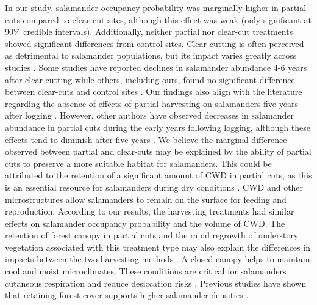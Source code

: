 In our study, salamander occupancy probability was marginally higher in partial cuts compared to clear-cut sites, although this effect was weak (only significant at 90\% credible intervals). 
Additionally, neither partial nor clear-cut treatments showed significant differences from control sites. 
Clear-cutting is often perceived as detrimental to salamander populations, but its impact varies greatly across studies \citep{Hocking2013Effectsexperimental,Chaudhary2016Impactforest}. 
Some studies have reported declines in salamander abundance 4-6 years after clear-cutting \citep{Petranka1993Effectstimber,Herbeck1999PlethodontidSalamander,Grialou2000effectsforest,Macneil2014Effectstimber}  
while others, including ours, found no significant difference between clear-cuts and control sites \citep{Renken2004EffectsForest,Mazerolle2021Woodlandsalamander}. 
Our findings also align with the literature regarding the absence of effects of partial harvesting on salamanders five years after logging \citep{McKenny2006Effectsstructural,Mazerolle2021Woodlandsalamander,Ochs2022Responseterrestrial}. 
However, other authors have observed decreases in salamander abundance in partial cuts during the early years following logging, although these effects tend to diminish after five years \citep{Harpole1999Effectsseven,Knapp2003Initialeffects,Morneault2004effectshelterwood}.  
We believe the marginal difference observed between partial and clear-cuts may be explained by the ability of partial cuts to preserve a more suitable habitat for salamanders. 
This could be attributed to the retention of a significant amount of CWD in partial cuts, as this is an essential resource for salamanders during dry conditions \citep{Nolet2018Comparingeffects,Peterman2014Spatialvariation,Achat2015Quantifyingconsequences,Peele2017Effectswoody}.  
CWD and other microstructures allow salamanders to remain on the surface for feeding and reproduction. 
According to our results, the harvesting treatments had similar effects on salamander occupancy probability and the volume of CWD. 
The retention of forest canopy in partial cuts and the rapid regrowth of understory vegetation associated with this treatment type may also explain the differences in impacts between the two harvesting methods \citep{Raybuck2015silviculturalpractices}. 
A closed canopy helps to maintain cool and moist microclimates. 
These conditions are critical for salamanders cutaneous respiration and reduce desiccation risks \citep{Homyack2011Energeticssurface}. 
Previous studies have shown that retaining forest cover supports higher salamander densities \citep{Hocking2013Effectsexperimental,Harper2015Impactforestry,Mahoney2016Woodlandsalamander}. 
